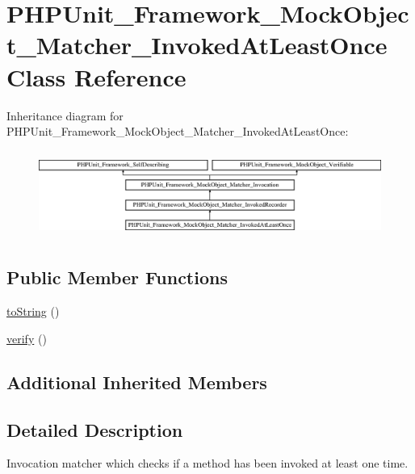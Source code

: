 \hypertarget{class_p_h_p_unit___framework___mock_object___matcher___invoked_at_least_once}{}\section{P\+H\+P\+Unit\+\_\+\+Framework\+\_\+\+Mock\+Object\+\_\+\+Matcher\+\_\+\+Invoked\+At\+Least\+Once Class Reference}
\label{class_p_h_p_unit___framework___mock_object___matcher___invoked_at_least_once}
Inheritance diagram for P\+H\+P\+Unit\+\_\+\+Framework\+\_\+\+Mock\+Object\+\_\+\+Matcher\+\_\+\+Invoked\+At\+Least\+Once\+:\begin{figure}[H]
\begin{center}
\leavevmode
\includegraphics[height=2.879177cm]{class_p_h_p_unit___framework___mock_object___matcher___invoked_at_least_once}
\end{center}
\end{figure}
\subsection*{Public Member Functions}
\begin{DoxyCompactItemize}
\item 
\mbox{\hyperlink{class_p_h_p_unit___framework___mock_object___matcher___invoked_at_least_once_a5558c5d549f41597377fa1ea8a1cefa3}{to\+String}} ()
\item 
\mbox{\hyperlink{class_p_h_p_unit___framework___mock_object___matcher___invoked_at_least_once_aa33600b6a1b28d0c4dfe4d468272aaa4}{verify}} ()
\end{DoxyCompactItemize}
\subsection*{Additional Inherited Members}


\subsection{Detailed Description}
Invocation matcher which checks if a method has been invoked at least one time.

